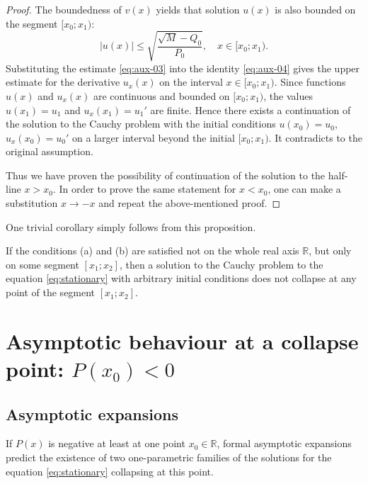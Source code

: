 \begin{proof}
	The boundedness of $v(x)$ yields that solution $u(x)$ is also bounded on the segment $[x_0; x_1)$:
	\begin{equation}
		|u(x)| \le \sqrt{\dfrac{\sqrt{M} - Q_0}{P_0}}, \quad x \in [x_0; x_1).
		\label{eq:aux-03}
	\end{equation}
	Substituting the estimate \eqref{eq:aux-03} into the identity \eqref{eq:aux-04} gives the upper estimate for the derivative $u_{x}(x)$ on the interval $x \in [x_0; x_1)$.
	Since functions $u(x)$ and $u_{x}(x)$ are continuous and bounded on $[x_0; x_1)$, the values $u(x_1) = u_1$ and $u_{x}(x_1) = u_1'$ are finite.
	Hence there exists a continuation of the solution to the Cauchy problem with the initial conditions $u(x_0) = u_0$, $u_{x}(x_0) = u_0'$ on a larger interval beyond the initial $[x_0; x_1)$.
	It contradicts to the original assumption.
	
	Thus we have proven the possibility of continuation of the solution to the half-line $x > x_0$.
	In order to prove the same statement for $x < x_0$, one can make a substitution $x \to -x$ and repeat the above-mentioned proof.
\end{proof}

One trivial corollary simply follows from this proposition.
\begin{corollary}
	If the conditions (a) and (b) are satisfied not on the whole real axis $\mathbb{R}$, but only on some segment $[x_1; x_2]$, then a solution to the Cauchy problem to the equation \eqref{eq:stationary} with arbitrary initial conditions does not collapse at any point of the segment $[x_1; x_2]$.
\end{corollary}

\section{Asymptotic behaviour at a collapse point: $P(x_0) < 0$}

\subsection{Asymptotic expansions}

If $P(x)$ is negative at least at one point $x_0 \in \mathbb{R}$, formal asymptotic expansions predict the existence of two one-parametric families of the solutions for the equation \eqref{eq:stationary} collapsing at this point.

